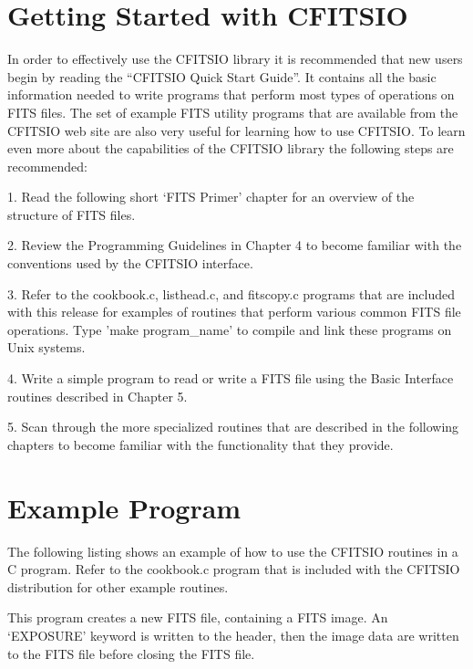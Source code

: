 \documentclass[11pt]{book}
\begin{document}
\section{Getting Started with CFITSIO}

In order to effectively use the CFITSIO library it is recommended that
new users begin by reading the ``CFITSIO Quick Start Guide''.  It
contains all the basic information needed to write programs that
perform most types of operations on FITS files.  The set of example
FITS utility programs that are available from the CFITSIO web site are
also very useful for learning how to use CFITSIO.  To learn even more
about the capabilities of the CFITSIO library the following steps are
recommended:

1.  Read the following short `FITS Primer' chapter for an overview of
the structure of FITS files.

2. Review the Programming Guidelines in Chapter 4 to become familiar
with the conventions used by the CFITSIO interface.

3.  Refer to the cookbook.c, listhead.c, and fitscopy.c programs that
are included with this release for examples of routines that perform
various common FITS file operations.  Type 'make program\_name' to
compile and link these programs on Unix systems.

4.  Write a simple program to read or write a FITS file using the Basic
Interface routines described in Chapter 5.

5.  Scan through the more specialized routines that are described in
the following chapters to become familiar with the functionality that
they provide.


\section{Example Program}

The following listing shows an example of how to use the CFITSIO
routines in a C program.    Refer to the cookbook.c program that is
included with the CFITSIO distribution for other example routines.

This program creates a new FITS file, containing a FITS image.  An
`EXPOSURE' keyword is written to the header, then the image data are
written to the FITS file before closing the FITS file.
\end{document}
